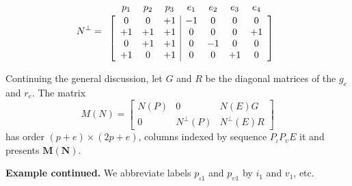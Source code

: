 \documentclass[12pt]{article}
\theoremstyle{definition}
\newcommand{\Is}{\ensuremath{\iota}}
\newcommand{\Vs}{\ensuremath{\upsilon}}
\newcommand{\ext}[1]{\ensuremath{\mathbf{#1}}}
\begin{document}
\[
N^\perp=
\begin{array}{c}
\begin{array}{ccccccc}
p_1 & p_2 & p_3 & e_1 & e_2 & e_3 & e_4 \\[-1em]
\hphantom{+1} & \hphantom{+1} &\hphantom{+1} &\hphantom{+1} &\hphantom{+1} &\hphantom{+1} &\hphantom{+1} 
\end{array} \\ 
\left[\begin{array}{ccc|cccc}
  0 &  0  &  +1 &  -1 &   0 &  0  & 0 \\
 +1 &  +1 &  +1 &   0 &   0 &  0  & +1\\
  0 &  +1 &  +1 &   0 &  -1 &  0  &  0\\
 +1 &   0 &  +1 &   0 &   0 & +1  &  0
	\end{array}\right]
  \end{array}
\]

Continuing the general discussion, let 
$G$ and $R$ be the diagonal matrices of the $g_e$ and $r_e$.
The matrix
\begin{equation}
\label{PairsmatrixM}
M(N)
=
\left[
	\begin{array}{ccc}
		N(P) & 0 & N(E)G \\
		0    & N^{\perp}(P) & N^{\perp}(E)R
	\end{array}
  \right]
\end{equation}
has order $(p+e)\times(2p+e)$, columns indexed by sequence
$P_{\Is}P_{\Vs}E$ it and presents $\ext{M}(\ext{N})$.

\textbf{Example continued.}
We abbreviate labels $p_{\Is 1}$ and $p_{\Vs 1}$ by $i_1$ and $v_1$, etc.

\end{document}
